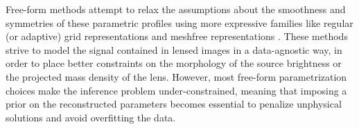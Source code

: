 Free-form methods attempt to relax the assumptions about the smoothness and symmetries of these parametric profiles
using more expressive families like regular (or adaptive)
grid representations and meshfree representations
\citep{Saha1997,Abdelsalam1998,Abdelsalam1998b,Diego2005,Birrer2015,Merten2016}. 
These methods strive to model the signal contained in lensed images in a data-agnostic way, in order to place better constraints on the morphology of the source brightness or the 
projected mass density of the lens. 
However, most free-form parametrization choices make the inference problem under-constrained, meaning that imposing a prior on the reconstructed parameters becomes essential to penalize unphysical solutions and avoid overfitting the data.

